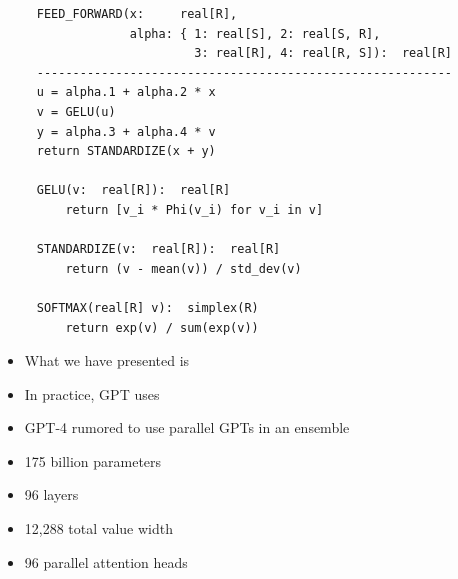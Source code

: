 \documentclass[9pt]{report}
\begin{document}
{\clearpage
\begin{verbatim}
     FEED_FORWARD(x:     real[R], 
                  alpha: { 1: real[S], 2: real[S, R], 
                           3: real[R], 4: real[R, S]):  real[R]
     ----------------------------------------------------------
     u = alpha.1 + alpha.2 * x
     v = GELU(u)              
     y = alpha.3 + alpha.4 * v
     return STANDARDIZE(x + y)

     GELU(v:  real[R]):  real[R]
         return [v_i * Phi(v_i) for v_i in v]

     STANDARDIZE(v:  real[R]):  real[R]
         return (v - mean(v)) / std_dev(v)

     SOFTMAX(real[R] v):  simplex(R)
         return exp(v) / sum(exp(v))
\end{verbatim}
\normalsize
\renewcommand{\baselinestretch}{1}

\begin{itemize}
\item What we have presented is 
\item In practice, GPT uses 
\item GPT-4 rumored to use parallel GPTs in an ensemble
\end{itemize}

\begin{itemize}
\item 175 billion parameters 
\item 96 layers 
\item 12,288 total value width 
\item 96 parallel attention heads 
\end{itemize}

}
\end{document}
